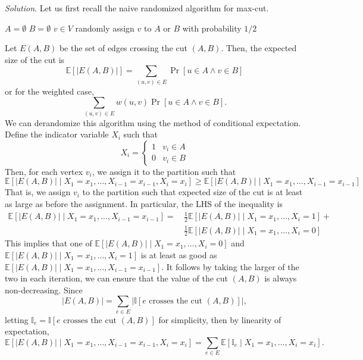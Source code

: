 \documentclass[11pt]{article}
\newcommand{\Exp}{\mathbb{E}}
\begin{document}
\begin{enumerate}[leftmargin=16pt]
    \textit{Solution}. Let us first recall the naive randomized algorithm for max-cut.

    \begin{codebox}
        \li $A = \emptyset$
        \li $B = \emptyset$
        \li \For $v \in V$ \Do
            \li randomly assign $v$ to $A$ or $B$ with probability $1/2$      
    \end{codebox}
    Let $E(A,B)$ be the set of edges crossing the cut $(A,B)$. Then, the expected size of the cut is
    $$
    \Exp[|E(A,B)|] = \sum_{(u,v) \in E} \Pr[u \in A \land v \in B]
    $$
    or for the weighted case,
    $$
    \sum_{(u,v) \in E} w(u,v) \Pr[u \in A \land v \in B].
    $$
    We can derandomize this algorithm using the method of conditional expectation. Define the indicator variable $X_i$ such that
    $$
    X_i = \begin{cases}
        1 & v_i \in A \\
        0 & v_i \in B
    \end{cases}
    $$
    Then, for each vertex $v_i$, we assign it to the partition such that
    $$
    \Exp[|E(A,B)| \mid X_1 = x_1, \ldots, X_{i-1} = x_{i-1}, X_i = x_i] \geq \Exp[|E(A,B)| \mid X_1 = x_1, \ldots, X_{i-1} = x_{i-1}]
    $$
    That is, we assign $v_i$ to the partition such that expected size of the cut is at least as large as before the assignment. In particular, the LHS of the inequality is
    $$
    \begin{aligned}
        \Exp[|E(A,B)| \mid X_1 = x_1, \ldots, X_{i-1} = x_{i-1}] = \,& \frac{1}{2} \Exp[|E(A,B)| \mid X_1 = x_1, \ldots, X_i = 1] + \\
        & \frac{1}{2} \Exp[|E(A,B)| \mid X_1 = x_1, \ldots, X_i = 0]
    \end{aligned}
    $$
    This implies that one of $\Exp[|E(A,B)| \mid X_1 = x_1, \ldots, X_i = 0]$ and $\Exp[|E(A,B)| \mid X_1 = x_1, \ldots, X_i = 1]$ is at least as good as $\Exp[|E(A,B)| \mid X_1 = x_1, \ldots, X_{i-1} = x_{i-1}]$. It follows by taking the larger of the two in each iteration, we can ensure that the value of the cut $(A,B)$ is always non-decreasing. Since
    $$
    |E(A,B)| = \sum_{e \in E} | \mathbb{I}[\text{$e$ crosses the cut $(A,B)$}] |,
    $$
    letting $\mathbb{I}_e = \mathbb{I}[\text{$e$ crosses the cut $(A,B)$}]$ for simplicity, then by linearity of expectation,
    \begin{equation} \label{eq:exp-eab}
        \Exp[|E(A,B)| \mid X_1 = x_1, \ldots, X_{i-1} = x_{i-1}, X_i = x_i] = \sum_{e \in E} \Exp[\mathbb{I}_e \mid X_1 = x_1,\ldots, X_i = x_i ].

\end{equation}
\end{enumerate}
\end{document}
